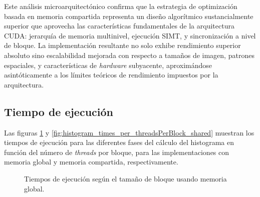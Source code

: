         Este análisis microarquitectónico confirma que la estrategia de optimización basada en memoria compartida representa un diseño algorítmico sustancialmente superior que aprovecha las características fundamentales de la arquitectura CUDA: jerarquía de memoria multinivel, ejecución SIMT, y sincronización a nivel de bloque. La implementación resultante no solo exhibe rendimiento superior absoluto sino escalabilidad mejorada con respecto a tamaños de imagen, patrones espaciales, y características de \textit{hardware} subyacente, aproximándose asintóticamente a los límites teóricos de rendimiento impuestos por la arquitectura.

    \subsection{Tiempo de ejecución}

        Las figuras \ref{fig:histogram_times_per_threadsPerBlock_global} y \ref{fig:histogram_times_per_threadsPerBlock_shared} muestran los tiempos de ejecución para las diferentes fases del cálculo del histograma en función del número de \textit{threads} por bloque, para las implementaciones con memoria global y memoria compartida, respectivamente.

        \begin{figure}[H]
            \centering
            \caption{Tiempos de ejecución según el tamaño de bloque usando memoria global.}
            \label{fig:histogram_times_per_threadsPerBlock_global}
        \end{figure}
        
